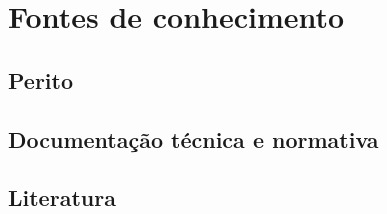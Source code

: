 \chapter{Fontes de conhecimento}
\label{cap:fontes}

\section{Perito}


\section{Documentação técnica e normativa}


\section{Literatura}


